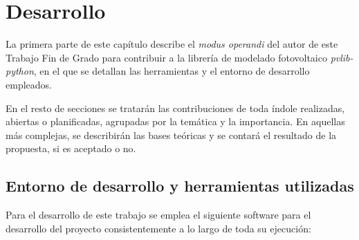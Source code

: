 \chapter{Desarrollo} \label{chp:desarrollo}

La primera parte de este capítulo describe el \textit{modus operandi} del autor de este Trabajo Fin de Grado para contribuir a la librería de modelado fotovoltaico \textit{pvlib-python}, en el que se detallan las herramientas y el entorno de desarrollo empleados.

En el resto de secciones se tratarán las contribuciones de toda índole realizadas, abiertas o planificadas, agrupadas por la temática y la importancia. En aquellas más complejas, se describirán las bases teóricas y se contará el resultado de la propuesta, si es aceptado o no.

\section{Entorno de desarrollo y herramientas utilizadas} \label{sct:desarrollo:entorno}

Para el desarrollo de este trabajo se emplea el siguiente software para el desarrollo del proyecto consistentemente a lo largo de toda su ejecución:

